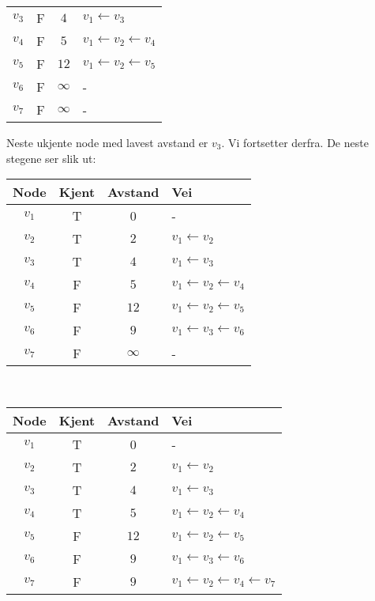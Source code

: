 \begin{eks}
\begin{center}
\begin{tabular}{c | c | c | l}
	$ v_3 $ & F     & $ 4 $      & $ v_1 \leftarrow v_3 $                \\
	$ v_4 $ & F     & $ 5 $      & $ v_1 \leftarrow v_2 \leftarrow v_4 $ \\
	$ v_5 $ & F     & $ 12 $     & $ v_1 \leftarrow v_2 \leftarrow v_5 $ \\
	$ v_6 $ & F     & $ \infty $ & -                                     \\
	$ v_7 $ & F     & $ \infty $ & -
\end{tabular}
\end{center}
Neste ukjente node med lavest avstand er $ v_3 $. Vi fortsetter derfra. De neste stegene ser slik ut:
\begin{center}
\begin{tabular}{c | c | c | l}
	 Node   & Kjent & Avstand    & Vei                                   \\ \hline
	$ v_1 $ & T     & 0          & -                                     \\
	$ v_2 $ & T     & $ 2 $      & $ v_1 \leftarrow v_2 $                \\
	$ v_3 $ & T     & $ 4 $      & $ v_1 \leftarrow v_3 $                \\
	$ v_4 $ & F     & $ 5 $      & $ v_1 \leftarrow v_2 \leftarrow v_4 $ \\
	$ v_5 $ & F     & $ 12 $     & $ v_1 \leftarrow v_2 \leftarrow v_5 $ \\
	$ v_6 $ & F     & $ 9 $      & $ v_1 \leftarrow v_3 \leftarrow v_6 $ \\
	$ v_7 $ & F     & $ \infty $ & -
\end{tabular}~~
\begin{tabular}{c | c | c | l}
	 Node   & Kjent & Avstand & Vei                                                  \\ \hline
	$ v_1 $ & T     & 0       & -                                                    \\
	$ v_2 $ & T     & $ 2 $   & $ v_1 \leftarrow v_2 $                               \\
	$ v_3 $ & T     & $ 4 $   & $ v_1 \leftarrow v_3 $                               \\
	$ v_4 $ & T     & $ 5 $   & $ v_1 \leftarrow v_2 \leftarrow v_4 $                \\
	$ v_5 $ & F     & $ 12 $  & $ v_1 \leftarrow v_2 \leftarrow v_5 $                \\
	$ v_6 $ & F     & $ 9 $   & $ v_1 \leftarrow v_3 \leftarrow v_6 $                \\
	$ v_7 $ & F     & $ 9 $   & $ v_1 \leftarrow v_2 \leftarrow v_4 \leftarrow v_7 $
\end{tabular}
\end{center}


\end{eks}
